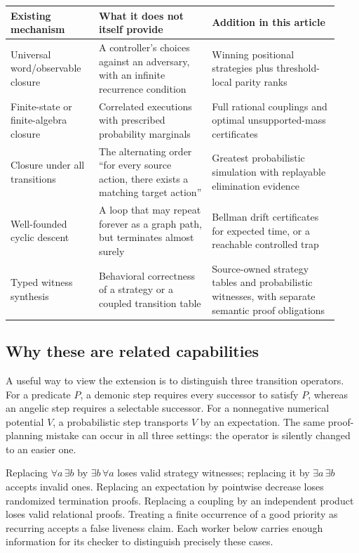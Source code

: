 \begin{longtable}{@{}L{0.25\linewidth}L{0.32\linewidth}L{0.36\linewidth}@{}}
\toprule
Existing mechanism & What it does not itself provide & Addition in this article \\
\midrule
\endhead
Universal word/observable closure & A controller's choices against an adversary,
with an infinite recurrence condition & Winning positional strategies plus
threshold-local parity ranks \\
Finite-state or finite-algebra closure & Correlated executions with prescribed
probability marginals & Full rational couplings and optimal unsupported-mass
certificates \\
Closure under all transitions & The alternating order ``for every source action,
there exists a matching target action'' & Greatest probabilistic simulation with
replayable elimination evidence \\
Well-founded cyclic descent & A loop that may repeat forever as a graph path,
but terminates almost surely & Bellman drift certificates for expected time,
or a reachable controlled trap \\
Typed witness synthesis & Behavioral correctness of a strategy or a coupled
transition table & Source-owned strategy tables and probabilistic witnesses,
with separate semantic proof obligations \\
\bottomrule
\end{longtable}

\subsection{Why these are related capabilities}

A useful way to view the extension is to distinguish three transition
operators. For a predicate $P$, a demonic step requires every successor to
satisfy $P$, whereas an angelic step requires a selectable successor. For a
nonnegative numerical potential $V$, a probabilistic step transports $V$ by an
expectation. The same proof-planning mistake can occur in all three settings:
the operator is silently changed to an easier one.

Replacing $\forall a\,\exists b$ by $\exists b\,\forall a$ loses valid strategy
witnesses; replacing it by $\exists a\,\exists b$ accepts invalid ones. Replacing
an expectation by pointwise decrease loses randomized termination proofs.
Replacing a coupling by an independent product loses valid relational proofs.
Treating a finite occurrence of a good priority as recurring accepts a false
liveness claim. Each worker below carries enough information for its checker
to distinguish precisely these cases.


